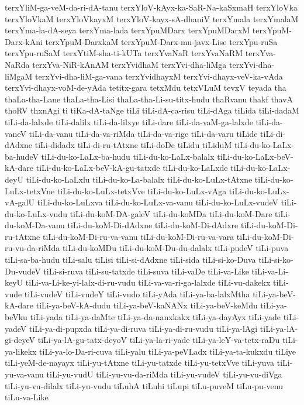 {terxYliM-ga-veM-da-ri-dA-tanu
terxYloV-kAyx-ka-SaR-Na-kaSxmaH
terxYloVka
terxYloVkaM
terxYloVkayxM
terxYloV-kayx-sA-dhaniV
terxYmala
terxYmalaM
terxYma-la-dA-seya
terxYma-lada
terxYpuMDarx
terxYpuMDarxM
terxYpuM-Darx-kAni
terxYpuM-DarxkaM
terxYpuM-Darx-mu-javx-Lise
terxYpu-ruSa
terxYpu-ruSaM
terxYtiM-sha-ti-kUTa
terxYvaNaR
terxYvaNaRM
terxYva-NaRda
terxYva-NiR-kAnAM
terxYvidhaM
terxYvi-dha-liMga
terxYvi-dha-liMgaM
terxYvi-dha-liM-ga-vana
terxYvidhayxM
terxYvi-dhayx-veV-ka-vAda
terxYvi-dhayx-voM-de-yAda
tetitx-gara
tetxMdu
tetxVLuM
tevxV
teyada
tha
thaLa-tha-Lane
thaLa-tha-Lisi
thaLa-tha-Li-su-titx-hudu
thaRvanu
thakf
thavA
thoRV
thxnAgi
ti
tiKa-dA-taNge
tiLi
tiLi-dA-ca-risu
tiLi-dAga
tiLida
tiLi-dadaM
tiLi-da-lalxde
tiLi-dalilx
tiLi-da-lilxye
tiLi-dare
tiLi-da-vaM-ga-lalxde
tiLi-da-vaneV
tiLi-da-vanu
tiLi-da-va-riMda
tiLi-da-va-rige
tiLi-da-varu
tiLide
tiLi-di-dAdxne
tiLi-didadx
tiLi-di-ru-tAtxne
tiLi-doDe
tiLidu
tiLiduM
tiLi-du-ko-LaLx-ba-hudeV
tiLi-du-ko-LaLx-ba-hudu
tiLi-du-ko-LaLx-balalx
tiLi-du-ko-LaLx-beV-kA-dare
tiLi-du-ko-LaLx-beV-kA-gu-tatxde
tiLi-du-ko-LaLxde
tiLi-du-ko-LaLx-deyU
tiLi-du-ko-LaLxlu
tiLi-du-ko-La-balalx
tiLi-du-ko-LuLx-tAtxne
tiLi-du-ko-LuLx-tetxVne
tiLi-du-ko-LuLx-tetxVve
tiLi-du-ko-LuLx-vAga
tiLi-du-ko-LuLx-vA-galU
tiLi-du-ko-LuLxva
tiLi-du-ko-LuLx-va-vanu
tiLi-du-ko-LuLx-vudeV
tiLi-du-ko-LuLx-vudu
tiLi-du-koM-DA-galeV
tiLi-du-koMDa
tiLi-du-koM-Dare
tiLi-du-koM-Da-vanu
tiLi-du-koM-Di-dAdxne
tiLi-du-koM-Di-dAdxre
tiLi-du-koM-Di-ru-tAtxne
tiLi-du-koM-Di-ru-va-vanu
tiLi-du-koM-Di-ru-va-vara
tiLi-du-koM-Di-ru-vu-da-riMda
tiLi-du-koMDu
tiLi-du-koM-Du-du-dalalx
tiLi-pudeV
tiLi-puva
tiLi-sa-ba-hudu
tiLi-salu
tiLisi
tiLi-si-dAdxne
tiLi-sida
tiLi-si-ko-Duva
tiLi-si-ko-Du-vudeV
tiLi-si-ruva
tiLi-su-tatxde
tiLi-suva
tiLi-vaDe
tiLi-va-Like
tiLi-va-Li-keyU
tiLi-va-Li-ke-yi-lalx-di-ru-vudu
tiLi-va-va-ri-ga-lalxde
tiLi-vu-dakekx
tiLi-vude
tiLi-vudeV
tiLi-vudeY
tiLi-vudo
tiLi-yAda
tiLi-ya-ba-lalxMtha
tiLi-ya-beV-kA-dare
tiLi-ya-beV-kA-dudu
tiLi-ya-beV-kaNANx
tiLi-ya-beV-keMdu
tiLi-ya-beVku
tiLi-yada
tiLi-ya-daMte
tiLi-ya-da-nanxkakx
tiLi-ya-dayAyx
tiLi-yade
tiLi-yadeV
tiLi-ya-di-pupxda
tiLi-ya-di-ruva
tiLi-ya-di-ru-vudu
tiLi-ya-lAgi
tiLi-ya-lA-gi-deyeV
tiLi-ya-lA-gu-tatx-deyoV
tiLi-ya-la-ri-yade
tiLi-ya-leY-va-tetx-raDu
tiLi-ya-likekx
tiLi-ya-lo-Da-ri-cuva
tiLi-yalu
tiLi-ya-peVLadx
tiLi-ya-ta-kukxdu
tiLiye
tiLi-yeM-de-nayayx
tiLi-yu-tAtxne
tiLi-yu-tatxde
tiLi-yu-tetxVve
tiLi-yuva
tiLi-yu-va-vanu
tiLi-yu-vudU
tiLi-yu-vu-da-riMda
tiLi-yu-vudeV
tiLi-yu-vu-diVga
tiLi-yu-vu-dilalx
tiLi-yu-vudu
tiLuhA
tiLuhi
tiLupi
tiLu-puveM
tiLu-pu-venu
tiLu-va-Like
}
